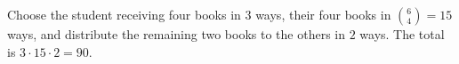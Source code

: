 Choose the student receiving four books in $3$ ways, their four books in $\binom 64=15$ ways, and distribute the remaining two books to the others in $2$ ways. The total is $3\cdot 15\cdot 2=\boxed{90}$.
